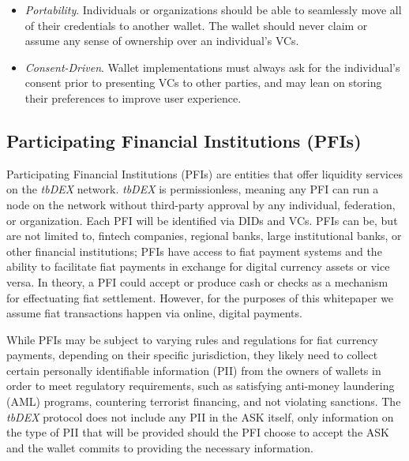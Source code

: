\documentclass[11pt]{article}
\begin{document}
\begin{itemize}
	\item \textit{Portability}. Individuals or organizations should be able to seamlessly move all of their credentials to another wallet. The wallet should never claim or assume any sense of ownership over an individual’s VCs.

	\item \textit{Consent-Driven}. Wallet implementations must always ask for the individual’s consent prior to presenting VCs to other parties, and may lean on storing their preferences to improve user experience.

\end{itemize}
\subsection{Participating Financial Institutions (PFIs)}

\vspace{1\baselineskip}
Participating Financial Institutions (PFIs) are entities that offer liquidity services on the \textit{tbDEX }network. \textit{tbDEX }is permissionless, meaning any PFI can run a node on the network without third-party approval by any individual, federation, or organization.  Each PFI will be identified via DIDs and VCs. PFIs can be, but are not limited to, fintech companies, regional banks, large institutional banks, or other financial institutions; PFIs have access to fiat payment systems and the ability to facilitate fiat payments in exchange for digital currency assets or vice versa. In theory, a PFI could accept or produce cash or checks as a mechanism for effectuating fiat settlement. However, for the purposes of this whitepaper we assume fiat transactions happen via online, digital payments.

\vspace{1\baselineskip}
While PFIs may be subject to varying rules and regulations for fiat currency payments, depending on their specific jurisdiction, they likely need to collect certain personally identifiable information (PII) from the owners of wallets in order to meet regulatory requirements, such as satisfying anti-money laundering (AML) programs, countering terrorist financing, and not violating sanctions.  The \textit{tbDEX }protocol does not include any PII in the ASK itself, only information on the type of PII that will be provided should the PFI choose to accept the ASK and the wallet commits to providing the necessary information. 
\end{document}
